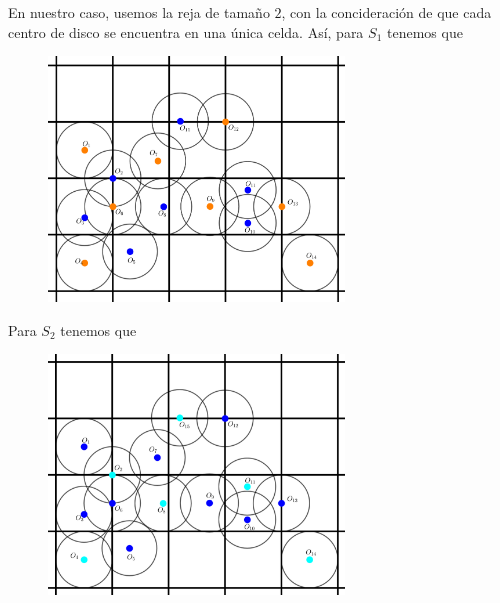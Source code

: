\begin{frame}
  En nuestro caso, usemos la reja de tamaño $2$, con la concideración de que cada
  centro de disco se encuentra en una única celda. Así, para $S_1$ tenemos que
  \begin{figure}  
    \centering
    \includegraphics[width=0.7\textwidth]{./Images/R1.png}
  \end{figure}
\end{frame}

\begin{frame}
  Para $S_2$ tenemos que
  \begin{figure}  
    \centering
    \includegraphics[width=0.7\textwidth]{./Images/R2.png}
  \end{figure}
\end{frame}

